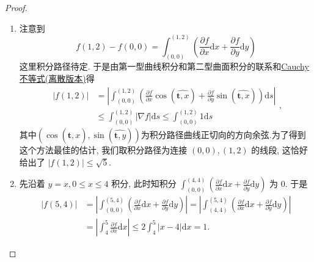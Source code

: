 \documentclass[../../main.tex]{subfiles}
\begin{document}
\begin{proof}
\begin{enumerate}
\item 注意到
\[
f(1,2) - f(0,0) = \int_{(0,0)}^{(1,2)} \left( \frac{\partial f}{\partial x} \mathrm{d}x + \frac{\partial f}{\partial y} \mathrm{d}y \right)
\]
这里积分路径待定. 于是由第一型曲线积分和第二型曲面积分的联系和\hyperref[theorem:Cauchy不等式]{Cauchy不等式(离散版本)}得
\[
\begin{aligned}
|f(1,2)| &= \left| \int_{(0,0)}^{(1,2)} \left( \frac{\partial f}{\partial x} \cos \left( \widehat{\boldsymbol{t},x} \right)  + \frac{\partial f}{\partial y} \sin \left( \widehat{\boldsymbol{t},x} \right)  \right) \mathrm{d}s \right| \\
&\leqslant \int_{(0,0)}^{(1,2)} |\nabla f| \mathrm{d}s \leqslant \int_{(0,0)}^{(1,2)} 1 \mathrm{d}s
\end{aligned},
\]
其中$\left( \cos \left( \widehat{\boldsymbol{t},x} \right) ,\sin \left( \widehat{\boldsymbol{t},y} \right) \right) $为积分路径曲线正切向的方向余弦.为了得到这个方法最佳的估计, 我们取积分路径为连接 \( (0,0),(1,2) \) 的线段, 这恰好给出了 \( |f(1,2)| \leqslant \sqrt{5} \).

\item 先沿着 \( y = x, 0 \leqslant x \leqslant 4 \) 积分, 此时知积分 \( \int_{(0,0)}^{(4,4)} \left( \frac{\partial f}{\partial x} \mathrm{d}x + \frac{\partial f}{\partial y} \mathrm{d}y \right) \) 为 0. 于是
\[
\begin{aligned}
|f(5,4)| &= \left| \int_{(0,0)}^{(5,4)} \left( \frac{\partial f}{\partial x} \mathrm{d}x + \frac{\partial f}{\partial y} \mathrm{d}y \right) \right| = \left| \int_{(4,4)}^{(5,4)} \left( \frac{\partial f}{\partial x} \mathrm{d}x + \frac{\partial f}{\partial y} \mathrm{d}y \right) \right| \\
&= \left| \int_{4}^{5} \frac{\partial f}{\partial x} \mathrm{d}x \right| \leqslant 2 \int_{4}^{5} |x - 4| \mathrm{d}x = 1.
\end{aligned}
\]
\end{enumerate}
\end{proof}
\end{document}
